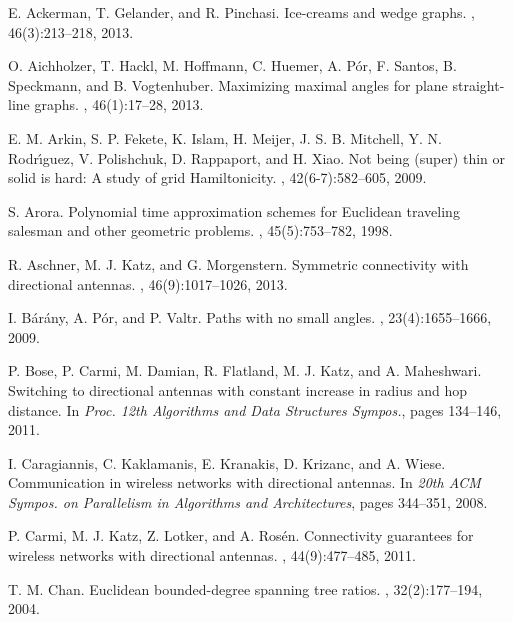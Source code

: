 \documentclass[11pt]{article}
\begin{document}
\begin{thebibliography}{1}

E. Ackerman, T. Gelander, and R. Pinchasi.
\newblock Ice-creams and wedge graphs.
, 46(3):213--218, 2013. 

O. Aichholzer, T. Hackl, M. Hoffmann, C. Huemer, A. P{\'o}r,
F. Santos, B. Speckmann, and B. Vogtenhuber.
\newblock Maximizing maximal angles for plane straight-line graphs.
, 46(1):17--28, 2013. 

E. M. Arkin, S. P. Fekete, K. Islam, H. Meijer, J. S. B. Mitchell, Y. N. Rodr\'{\i}guez, V. Polishchuk,  D. Rappaport, and H. Xiao.
\newblock Not being (super) thin or solid is hard: A study of grid Hamiltonicity.
, 42(6-7):582--605, 2009.

S. Arora.
\newblock Polynomial time approximation schemes for Euclidean traveling salesman and other geometric problems.
, 45(5):753--782, 1998.
  
R. Aschner, M. J. Katz, and G. Morgenstern.
\newblock Symmetric connectivity with directional antennas.
, 46(9):1017--1026, 2013.

I. B{\'a}r{\'a}ny, A. P{\'o}r, and P. Valtr.
\newblock Paths with no small angles.
, 23(4):1655--1666, 2009.

P. Bose, P. Carmi, M. Damian, R. Flatland, M. J. Katz, and A. Maheshwari.
\newblock Switching to directional antennas with constant increase in radius and hop distance.
\newblock In {\em  Proc. 12th Algorithms and Data Structures Sympos.}, pages 134--146, 2011.

I. Caragiannis, C. Kaklamanis, E. Kranakis, D. Krizanc, and A. Wiese.
\newblock Communication in wireless networks with directional antennas.
\newblock In {\em 20th ACM Sympos. on Parallelism in Algorithms and Architectures}, pages 344--351, 2008.

  
P. Carmi, M. J. Katz, Z. Lotker, and A. Ros\'{e}n.
\newblock Connectivity guarantees for wireless networks with directional antennas.
, 44(9):477--485, 2011.

T. M. Chan.
\newblock Euclidean bounded-degree spanning tree ratios.
, 32(2):177--194, 2004. 


\end{thebibliography}
\end{document}
